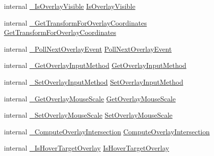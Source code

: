 \begin{DoxyCompactItemize}
\item 
internal \mbox{\hyperlink{struct_valve_1_1_v_r_1_1_i_v_r_overlay_afc7823ac1ca911ba5de47113a72d3930}{\+\_\+\+Is\+Overlay\+Visible}} \mbox{\hyperlink{struct_valve_1_1_v_r_1_1_i_v_r_overlay_a7f59db024e5aadf826774c610e15a888}{Is\+Overlay\+Visible}}
\item 
internal \mbox{\hyperlink{struct_valve_1_1_v_r_1_1_i_v_r_overlay_a5b737a48531e2ce68c2dc7f2a6e374f9}{\+\_\+\+Get\+Transform\+For\+Overlay\+Coordinates}} \mbox{\hyperlink{struct_valve_1_1_v_r_1_1_i_v_r_overlay_ab150fd8a577ba4296caa654c829ba44e}{Get\+Transform\+For\+Overlay\+Coordinates}}
\item 
internal \mbox{\hyperlink{struct_valve_1_1_v_r_1_1_i_v_r_overlay_aff9a0bf6a3969b29ae3af67dc6991c28}{\+\_\+\+Poll\+Next\+Overlay\+Event}} \mbox{\hyperlink{struct_valve_1_1_v_r_1_1_i_v_r_overlay_ae0ce46af1422a40dfc7d97c2e36d5bb3}{Poll\+Next\+Overlay\+Event}}
\item 
internal \mbox{\hyperlink{struct_valve_1_1_v_r_1_1_i_v_r_overlay_a0144a0a15ffc7d02c585198bc2cdcc7c}{\+\_\+\+Get\+Overlay\+Input\+Method}} \mbox{\hyperlink{struct_valve_1_1_v_r_1_1_i_v_r_overlay_aef3015811e68ebf12748318efe02a563}{Get\+Overlay\+Input\+Method}}
\item 
internal \mbox{\hyperlink{struct_valve_1_1_v_r_1_1_i_v_r_overlay_ab00e26696ac1201e4fb257bb32fb2557}{\+\_\+\+Set\+Overlay\+Input\+Method}} \mbox{\hyperlink{struct_valve_1_1_v_r_1_1_i_v_r_overlay_a435813588190b9a3cab143967e431d32}{Set\+Overlay\+Input\+Method}}
\item 
internal \mbox{\hyperlink{struct_valve_1_1_v_r_1_1_i_v_r_overlay_a2b69731883d25838d42be3fe85fa64b0}{\+\_\+\+Get\+Overlay\+Mouse\+Scale}} \mbox{\hyperlink{struct_valve_1_1_v_r_1_1_i_v_r_overlay_a3e8e1f0b9966106aaf90d37e2e1eeb5a}{Get\+Overlay\+Mouse\+Scale}}
\item 
internal \mbox{\hyperlink{struct_valve_1_1_v_r_1_1_i_v_r_overlay_a754c67b5ba2654c82e4f4e066d87af9f}{\+\_\+\+Set\+Overlay\+Mouse\+Scale}} \mbox{\hyperlink{struct_valve_1_1_v_r_1_1_i_v_r_overlay_a01b661fbcd161d5949cd5f4784219f8a}{Set\+Overlay\+Mouse\+Scale}}
\item 
internal \mbox{\hyperlink{struct_valve_1_1_v_r_1_1_i_v_r_overlay_a16aaf361f64b74515f0f9455b9e1aaaf}{\+\_\+\+Compute\+Overlay\+Intersection}} \mbox{\hyperlink{struct_valve_1_1_v_r_1_1_i_v_r_overlay_a7088870eec230f7fbca0e9444d55c3b0}{Compute\+Overlay\+Intersection}}
\item 
internal \mbox{\hyperlink{struct_valve_1_1_v_r_1_1_i_v_r_overlay_a1590850cc22c3398e21bdeff4eb15bbe}{\+\_\+\+Is\+Hover\+Target\+Overlay}} \mbox{\hyperlink{struct_valve_1_1_v_r_1_1_i_v_r_overlay_a45ae0e59b0f2c9ba8ea83ac22c984564}{Is\+Hover\+Target\+Overlay}}

\end{DoxyCompactItemize}
